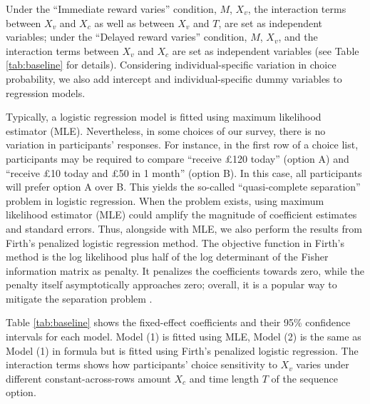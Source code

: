 \documentclass[
  12pt,
]{article}
\begin{document}
Under the ``Immediate reward varies'' condition, \(M\), \(X_v\), the
interaction terms between \(X_v\) and \(X_c\) as well as between \(X_v\)
and \(T\), are set as independent variables; under the ``Delayed reward
varies'' condition, \(M\), \(X_v\), and the interaction terms between
\(X_v\) and \(X_c\) are set as independent variables (see Table
\ref{tab:baseline} for details). Considering individual-specific
variation in choice probability, we also add intercept and
individual-specific dummy variables to regression models.

Typically, a logistic regression model is fitted using maximum
likelihood estimator (MLE). Nevertheless, in some choices of our survey,
there is no variation in participants' responses. For instance, in the
first row of a choice list, participants may be required to compare
``receive £120 today'' (option A) and ``receive £10 today and £50 in 1
month'' (option B). In this case, all participants will prefer option A
over B. This yields the so-called ``quasi-complete separation'' problem
in logistic regression. When the problem exists, using maximum
likelihood estimator (MLE) could amplify the magnitude of coefficient
estimates and standard errors. Thus, alongside with MLE, we also perform
the results from Firth's penalized logistic regression method. The
objective function in Firth's method is the log likelihood plus half of
the log determinant of the Fisher information matrix as penalty. It
penalizes the coefficients towards zero, while the penalty itself
asymptotically approaches zero; overall, it is a popular way to mitigate
the separation problem \citep{firth1993bias, heinze2002solution}.



Table \ref{tab:baseline} shows the fixed-effect coefficients and their
95\% confidence intervals for each model. Model (1) is fitted using MLE,
Model (2) is the same as Model (1) in formula but is fitted using
Firth's penalized logistic regression. The interaction terms shows how
participants' choice sensitivity to \(X_v\) varies under different
constant-across-rows amount \(X_c\) and time length \(T\) of the
sequence option.
\end{document}
